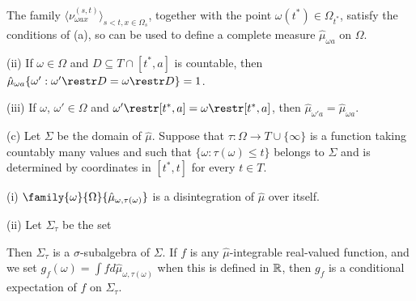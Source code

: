 \noindent The family
$\langle\nu^{(s,t)}_{\omega ax}\rangle_{s<t,x\in\Omega_s}$,
together with the point $\omega(t^*)\in\Omega_{t^*}$,
satisfy the conditions of (a), so can
be used to define a complete measure $\hat\mu_{\omega a}$ on $\Omega$.

\quad(ii) If $\omega\in\Omega$ and $D\subseteq T\cap[t^*,a]$
is countable, then
$\hat\mu_{\omega a}\{\omega':\omega'\restr D=\omega\restr D\}=1$.

\quad(iii) If $\omega$, $\omega'\in\Omega$ and
$\omega'\restr[t^*,a]=\omega\restr[t^*,a]$, then
$\hat\mu_{\omega' a}=\hat\mu_{\omega a}$.

(c) Let $\Sigma$ be the domain of $\hat\mu$.
Suppose that $\tau:\Omega\to T\cup\{\infty\}$ is a
function taking countably many
values and such that $\{\omega:\tau(\omega)\le t\}$ belongs to
$\Sigma$ and is determined by
coordinates in $[t^*,t]$ for every $t\in T$.

\quad(i) $\family{\omega}{\Omega}{\hat\mu_{\omega,\tau(\omega)}}$
is a disintegration of $\hat\mu$ over itself.

\quad(ii) Let $\Sigma_{\tau}$ be the set


\noindent Then $\Sigma_{\tau}$ is a $\sigma$-subalgebra of
$\Sigma$.   If
$f$ is any $\hat\mu$-integrable real-valued function, and we set
$g_f(\omega)=\int fd\hat\mu_{\omega,\tau(\omega)}$ when this is defined
in $\Bbb R$, then $g_f$ is a
conditional expectation of $f$ on $\Sigma_{\tau}$.

